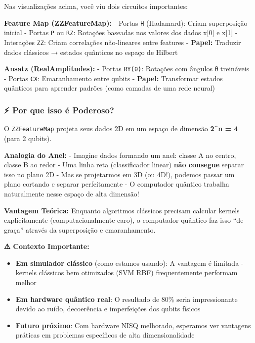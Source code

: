 \documentclass[
  brazilian,
]{report}
\providecommand{\tightlist}{%
  \setlength{\itemsep}{0pt}\setlength{\parskip}{0pt}}
\begin{document}
Nas visualizações acima, você viu dois circuitos importantes:

\textbf{Feature Map (ZZFeatureMap):} - Portas \texttt{H} (Hadamard):
Criam superposição inicial - Portas \texttt{P} ou \texttt{RZ}: Rotações
baseadas nos valores dos dados x{[}0{]} e x{[}1{]} - Interações
\texttt{ZZ}: Criam correlações não-lineares entre features -
\textbf{Papel:} Traduzir dados clássicos → estados quânticos no espaço
de Hilbert

\textbf{Ansatz (RealAmplitudes):} - Portas \texttt{RY(θ)}: Rotações com
ângulos θ treináveis - Portas \texttt{CX}: Emaranhamento entre qubits -
\textbf{Papel:} Transformar estados quânticos para aprender padrões
(como camadas de uma rede neural)

\subsubsection{⚡ Por que isso é
Poderoso?}\label{por-que-isso-uxe9-poderoso}

O \texttt{ZZFeatureMap} projeta seus dados 2D em um espaço de dimensão
\textbf{2\^{}n = 4} (para 2 qubits).

\textbf{Analogia do Anel:} - Imagine dados formando um anel: classe A no
centro, classe B ao redor - Uma linha reta (classificador linear)
\textbf{não consegue} separar isso no plano 2D - Mas se projetarmos em
3D (ou 4D!), podemos passar um plano cortando e separar perfeitamente -
O computador quântico trabalha naturalmente nesse espaço de alta
dimensão!

\textbf{Vantagem Teórica:} Enquanto algoritmos clássicos precisam
calcular kernels explicitamente (computacionalmente caro), o computador
quântico faz isso ``de graça'' através da superposição e emaranhamento.

\textbf{⚠️ Contexto Importante:}

\begin{itemize}
\tightlist
\item
  \textbf{Em simulador clássico} (como estamos usando): A vantagem é
  limitada - kernels clássicos bem otimizados (SVM RBF) frequentemente
  performam melhor
\item
  \textbf{Em hardware quântico real}: O resultado de 80\% seria
  impressionante devido ao ruído, decoerência e imperfeições dos qubits
  físicos
\item
  \textbf{Futuro próximo}: Com hardware NISQ melhorado, esperamos ver
  vantagens práticas em problemas específicos de alta dimensionalidade
\end{itemize}
\end{document}
